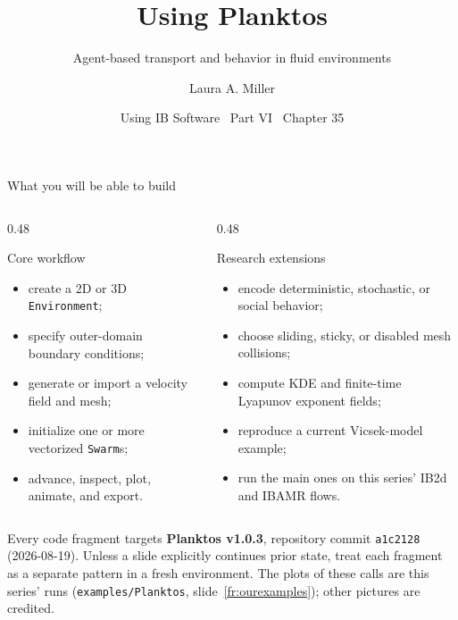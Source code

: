 \documentclass[aspectratio=169,11pt]{beamer}
\title[Using Planktos]{Using Planktos}
\subtitle{Agent-based transport and behavior in fluid environments}
\author[Miller]{Laura A. Miller}
\institute[UArizona]{Department of Mathematics, University of Arizona}
\date{Using IB Software \textbullet\ Part VI \textbullet\ Chapter 35}
\begin{document}
\begin{frame}[plain]
\end{frame}

\begin{frame}{What you will be able to build}
\begin{columns}[T,onlytextwidth]
\begin{column}{0.48\textwidth}
\begin{block}{Core workflow}
\begin{itemize}\itemsep2pt
  \item create a 2D or 3D \texttt{Environment};
  \item specify outer-domain boundary conditions;
  \item generate or import a velocity field and mesh;
  \item initialize one or more vectorized \texttt{Swarm}s;
  \item advance, inspect, plot, animate, and export.
\end{itemize}
\end{block}
\end{column}
\begin{column}{0.48\textwidth}
\begin{block}{Research extensions}
\begin{itemize}\itemsep1pt
  \item encode deterministic, stochastic, or social behavior;
  \item choose sliding, sticky, or disabled mesh collisions;
  \item compute KDE and finite-time Lyapunov exponent fields;
  \item reproduce a current Vicsek-model example;
  \item run the main ones on this series' IB2d and IBAMR flows.
\end{itemize}
\end{block}
\end{column}
\end{columns}
\begin{punchbox}
\footnotesize
\centering
Every code fragment targets \textbf{Planktos v1.0.3}, repository commit \texttt{a1c2128} (2026-08-19). Unless a slide explicitly continues prior state, treat each fragment as a separate pattern in a fresh environment. The plots of these calls are this series' runs (\texttt{examples/Planktos}, slide~\ref{fr:ourexamples}); other pictures are credited.
\end{punchbox}
\end{frame}
\end{document}
